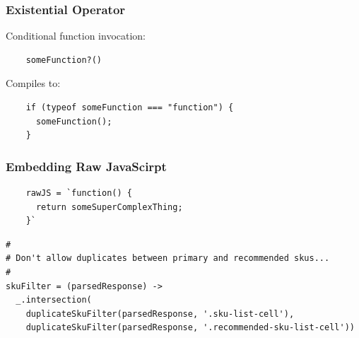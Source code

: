 \documentclass{beamer}
\begin{document}
 \begin{frame}[fragile]
  \frametitle{Existential Operator}


  Conditional function invocation:

  \begin{verbatim}
    someFunction?()
  \end{verbatim}

  Compiles to:

  \begin{verbatim}
    if (typeof someFunction === "function") {
      someFunction();
    }
  \end{verbatim}  
\end{frame}


\begin{frame}[fragile]
  \frametitle{Embedding Raw JavaScirpt}
  \begin{verbatim}
    rawJS = `function() {
      return someSuperComplexThing;
    }`
  \end{verbatim}
\end{frame}


\begin{frame}[fragile]
\begin{verbatim}
#
# Don't allow duplicates between primary and recommended skus...
#
skuFilter = (parsedResponse) ->
  _.intersection(
    duplicateSkuFilter(parsedResponse, '.sku-list-cell'),
    duplicateSkuFilter(parsedResponse, '.recommended-sku-list-cell'))
\end{verbatim}
\end{frame}
\end{document}
